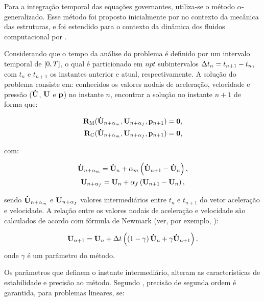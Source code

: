\documentclass[tese_patricia]{subfiles}%
\begin{document}
Para a integração temporal das equações governantes, utiliza-se o método $\alpha$-generalizado. Esse método foi proposto inicialmente por  no contexto da mecânica das estruturas, e foi estendido para o contexto da dinâmica dos fluidos computacional por .

Considerando que o tempo da análise do problema é definido por um intervalo temporal de $[0,T]$, o qual é particionado em $npt$ subintervalos $\Delta t_{n} = t_{n+1} - t_{n}$, com $t_{n}$ e $t_{n+1}$ os instantes anterior e atual, respectivamente. A solução do problema consiste em: conhecidos os valores nodais de aceleração, velocidade e pressão ($\mathbf{\dot{U}}$, $\mathbf{U}$ e $\mathbf{p}$) no instante $n$, encontrar a solução no instante $n+1$ de forma que:

\begin{align}
\mathbf{R}_\mathrm{M}(\mathbf{\dot{U}}_{n+\alpha_m},\mathbf{U}_{n+\alpha_f},\mathbf{p}_{n+1}) = \mathbf{0}, \label{eq:resid_QM_alpha}\\
\mathbf{R}_\mathrm{C}(\mathbf{\dot{U}}_{n+\alpha_m},\mathbf{U}_{n+\alpha_f},\mathbf{p}_{n+1}) = \mathbf{0}, \label{eq:resid_cont_alpha}
\end{align}

\noindent com:

\begin{gather}
\mathbf{\dot{U}}_{n+\alpha_m} = \mathbf{\dot{U}}_n + \alpha_m \left( \mathbf{\dot{U}}_{n+1} - \mathbf{\dot{U}}_n \right), \label{eq:inter_acel}\\
\mathbf{U}_{n+\alpha_f} = \mathbf{U}_n + \alpha_f \left( \mathbf{U}_{n+1} - \mathbf{U}_n \right), \label{eq:inter_vel}
\end{gather}

\noindent sendo $\mathbf{\dot{U}}_{n+\alpha_m}$ e $\mathbf{U}_{n+\alpha_f}$ valores intermediários entre $t_{n}$ e $t_{n+1}$ do vetor aceleração e velocidade. A relação entre os valores nodais de aceleração e velocidade são calculados de acordo com fórmula de Newmark (ver, por exemplo, \cite{Hughes:1976}):

\begin{gather}
\mathbf{U}_{n+1} = \mathbf{U}_n + \Delta t\left(\left(1-\gamma\right)\mathbf{\dot{U}}_n + \gamma\mathbf{\dot{U}}_{n+1} \right). \label{eq:Newmark}
\end{gather}
onde $\gamma$ é um parâmetro do método.

Os parâmetros que definem o instante intermediário, alteram as características de estabilidade e precisão ao método. Segundo , precisão de segunda ordem é garantida, para problemas lineares, se: 
\end{document}

